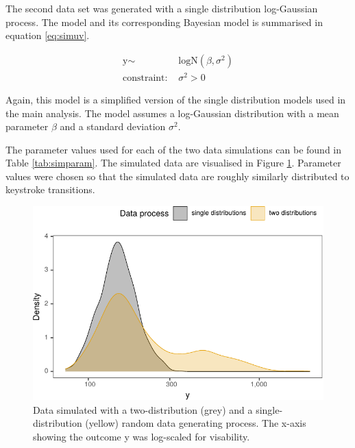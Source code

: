 \documentclass[
  english,
  man,floatsintext]{apa7}
\begin{document}
\begin{appendix}
The second data set was generated with a single distribution
log-Gaussian process. The model and its corresponding Bayesian model is
summarised in equation \ref{eq:simuv}.

\begin{equation}
\begin{aligned}
\label{eq:simuv}
\text{y} \sim\text{ }& \text{logN}(\beta, \sigma^2)\\
\text{constraint: } & \sigma^2>0
\end{aligned}
\end{equation}

Again, this model is a simplified version of the single distribution
models used in the main analysis. The model assumes a log-Gaussian
distribution with a mean parameter \(\beta\) and a standard deviation
\(\sigma^2\).

The parameter values used for each of the two data simulations can be
found in Table \ref{tab:simparam}. The simulated data are visualised in
Figure \ref{fig:simdata}. Parameter values were chosen so that the
simulated data are roughly similarly distributed to keystroke
transitions.

\begin{figure}

{\centering \includegraphics{manuscript_files/figure-latex/simdata-1} 

}

\caption{Data simulated with a two-distribution (grey) and a single-distribution (yellow) random data generating process. The x-axis showing the outcome y was log-scaled for visability.}\label{fig:simdata}
\end{figure}


\end{appendix}
\end{document}
